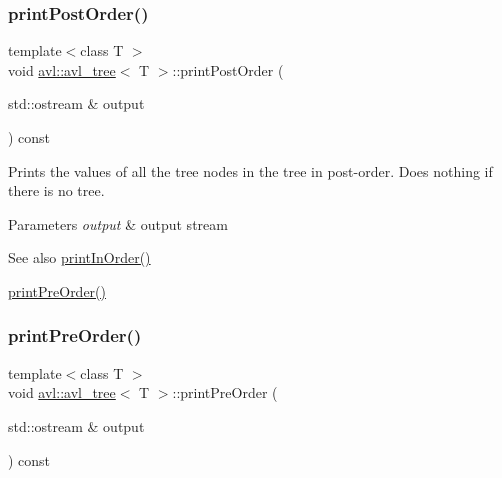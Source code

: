 \subsubsection{\texorpdfstring{print\+Post\+Order()}{printPostOrder()}}
{\footnotesize\ttfamily template$<$class T $>$ \\
void \hyperlink{classavl_1_1avl__tree}{avl\+::avl\+\_\+tree}$<$ T $>$\+::print\+Post\+Order (\begin{DoxyParamCaption}\item[{std\+::ostream \&}]{output }\end{DoxyParamCaption}) const\hspace{0.3cm}{\ttfamily [inline]}}

Prints the values of all the tree nodes in the tree in post-\/order. Does nothing if there is no tree. 
\begin{DoxyParams}{Parameters}
{\em output} & output stream \\
\hline
\end{DoxyParams}
\begin{DoxySeeAlso}{See also}
\hyperlink{classavl_1_1avl__tree_a335e8aec1bb894fb4140a1a05a77a271}{print\+In\+Order()} 

\hyperlink{classavl_1_1avl__tree_afee4a12bb06b3a9ccdf63ace4201ef41}{print\+Pre\+Order()} 
\end{DoxySeeAlso}
\mbox{\label{classavl_1_1avl__tree_afee4a12bb06b3a9ccdf63ace4201ef41}} 
\subsubsection{\texorpdfstring{print\+Pre\+Order()}{printPreOrder()}}
{\footnotesize\ttfamily template$<$class T $>$ \\
void \hyperlink{classavl_1_1avl__tree}{avl\+::avl\+\_\+tree}$<$ T $>$\+::print\+Pre\+Order (\begin{DoxyParamCaption}\item[{std\+::ostream \&}]{output }\end{DoxyParamCaption}) const\hspace{0.3cm}{\ttfamily [inline]}}


